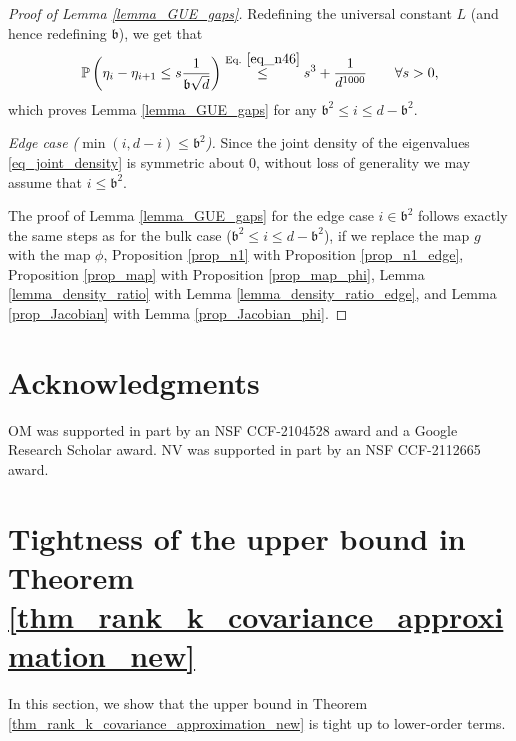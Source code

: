 \documentclass[11pt,letterpaper]{article}
\begin{document}
\begin{proof}[Proof of Lemma \ref{lemma_GUE_gaps}]
Redefining the universal constant $L$ (and hence redefining $\mathfrak{b}$), we get that
%
\begin{equation*}
    \mathbb{P}\left(\eta_i - \eta_{i+1} \leq s \frac{1}{\mathfrak{b}\sqrt{d}}\right) \stackrel{\textrm{Eq. } \eqref{eq_n46}}{\leq} s^{3} + \frac{1}{d^{1000}} \qquad \forall s>0,
\end{equation*}
%
which proves  Lemma \ref{lemma_GUE_gaps} for any $\mathfrak{b}^2 \leq i \leq d-\mathfrak{b}^2$.

\medskip
\noindent
{\em Edge case ($\min(i, d-i) \leq \mathfrak{b}^2$).}
%
Since the joint density of the eigenvalues  \eqref{eq_joint_density} is symmetric about $0$, without loss of generality we may assume that $i\leq \mathfrak{b}^2$.

The proof of Lemma \ref{lemma_GUE_gaps} for the edge case $i\in \mathfrak{b}^2$ follows exactly the same steps as for the bulk case ($\mathfrak{b}^2 \leq i \leq d-\mathfrak{b}^2$), if we replace the map $g$ with the map $\phi$, Proposition \ref{prop_n1} with Proposition \ref{prop_n1_edge}, Proposition \ref{prop_map} with Proposition \ref{prop_map_phi}, Lemma \ref{lemma_density_ratio} with Lemma \ref{lemma_density_ratio_edge}, and Lemma \ref{prop_Jacobian} with Lemma  \ref{prop_Jacobian_phi}.
\end{proof}



















\section*{Acknowledgments}
OM was supported in part by an NSF CCF-2104528 award and a Google Research Scholar award. 
NV was supported in part by an NSF CCF-2112665 award.  






\newpage
\appendix

\newpage



\section{Tightness of the upper bound in Theorem \ref{thm_rank_k_covariance_approximation_new}} \label{appendix_tightness}
In this section, we show that the upper bound in Theorem \ref{thm_rank_k_covariance_approximation_new} is tight up to lower-order terms.
\end{document}
